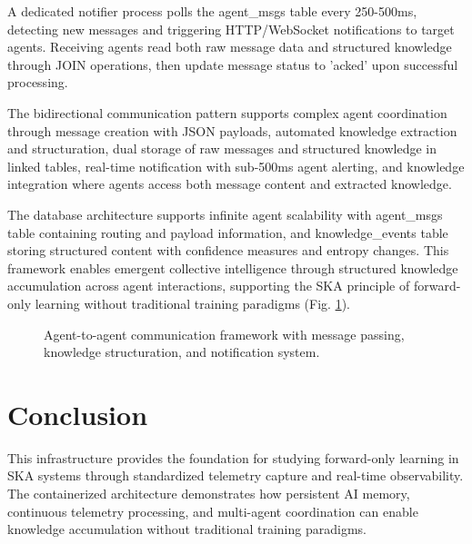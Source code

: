 \documentclass[11pt]{article}
\begin{document}
	A dedicated notifier process polls the agent\_msgs table every 250-500ms, detecting new messages and triggering HTTP/WebSocket notifications to target agents. Receiving agents read both raw message data and structured knowledge through JOIN operations, then update message status to 'acked' upon successful processing.
	
	The bidirectional communication pattern supports complex agent coordination through message creation with JSON payloads, automated knowledge extraction and structuration, dual storage of raw messages and structured knowledge in linked tables, real-time notification with sub-500ms agent alerting, and knowledge integration where agents access both message content and extracted knowledge.
	
	The database architecture supports infinite agent scalability with agent\_msgs table containing routing and payload information, and knowledge\_events table storing structured content with confidence measures and entropy changes. This framework enables emergent collective intelligence through structured knowledge accumulation across agent interactions, supporting the SKA principle of forward-only learning without traditional training paradigms (Fig. \ref{fig:agent-communication}).
	
	\begin{figure}
		\centering
		\scalebox{0.6}{}
		\caption{Agent-to-agent communication framework with message passing, knowledge structuration, and notification system.}
		\label{fig:agent-communication}
	\end{figure}
	
	\section{Conclusion}
	This infrastructure provides the foundation for studying forward-only learning in SKA systems through standardized telemetry capture and real-time observability. The containerized architecture demonstrates how persistent AI memory, continuous telemetry processing, and multi-agent coordination can enable knowledge accumulation without traditional training paradigms.
	
\end{document}
